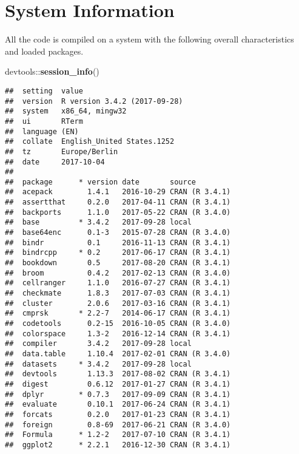 \documentclass[]{book}
\newenvironment{Shaded}{\begin{snugshade}}{\end{snugshade}}
\newcommand{\KeywordTok}[1]{\textcolor[rgb]{0.13,0.29,0.53}{\textbf{{#1}}}}
\newcommand{\NormalTok}[1]{{#1}}
\theoremstyle{definition}
\theoremstyle{definition}
\theoremstyle{definition}
\theoremstyle{remark}
\begin{document}
\section*{System Information}\label{system-information}

All the code is compiled on a system with the following overall
characteristics and loaded packages.

\begin{Shaded}
\begin{Highlighting}[]
\NormalTok{devtools::}\KeywordTok{session_info}\NormalTok{()}
\end{Highlighting}
\end{Shaded}

\begin{verbatim}
##  setting  value                       
##  version  R version 3.4.2 (2017-09-28)
##  system   x86_64, mingw32             
##  ui       RTerm                       
##  language (EN)                        
##  collate  English_United States.1252  
##  tz       Europe/Berlin               
##  date     2017-10-04                  
## 
##  package      * version date       source        
##  acepack        1.4.1   2016-10-29 CRAN (R 3.4.1)
##  assertthat     0.2.0   2017-04-11 CRAN (R 3.4.1)
##  backports      1.1.0   2017-05-22 CRAN (R 3.4.0)
##  base         * 3.4.2   2017-09-28 local         
##  base64enc      0.1-3   2015-07-28 CRAN (R 3.4.0)
##  bindr          0.1     2016-11-13 CRAN (R 3.4.1)
##  bindrcpp     * 0.2     2017-06-17 CRAN (R 3.4.1)
##  bookdown       0.5     2017-08-20 CRAN (R 3.4.1)
##  broom          0.4.2   2017-02-13 CRAN (R 3.4.0)
##  cellranger     1.1.0   2016-07-27 CRAN (R 3.4.1)
##  checkmate      1.8.3   2017-07-03 CRAN (R 3.4.1)
##  cluster        2.0.6   2017-03-16 CRAN (R 3.4.1)
##  cmprsk       * 2.2-7   2014-06-17 CRAN (R 3.4.1)
##  codetools      0.2-15  2016-10-05 CRAN (R 3.4.0)
##  colorspace     1.3-2   2016-12-14 CRAN (R 3.4.1)
##  compiler       3.4.2   2017-09-28 local         
##  data.table     1.10.4  2017-02-01 CRAN (R 3.4.0)
##  datasets     * 3.4.2   2017-09-28 local         
##  devtools       1.13.3  2017-08-02 CRAN (R 3.4.1)
##  digest         0.6.12  2017-01-27 CRAN (R 3.4.1)
##  dplyr        * 0.7.3   2017-09-09 CRAN (R 3.4.1)
##  evaluate       0.10.1  2017-06-24 CRAN (R 3.4.1)
##  forcats        0.2.0   2017-01-23 CRAN (R 3.4.1)
##  foreign        0.8-69  2017-06-21 CRAN (R 3.4.0)
##  Formula      * 1.2-2   2017-07-10 CRAN (R 3.4.1)
##  ggplot2      * 2.2.1   2016-12-30 CRAN (R 3.4.1)

\end{verbatim}
\end{document}
